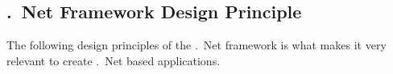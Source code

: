 %
%
%
%
%
%
%
%
%
%

\subsection*{.\ Net Framework Design Principle}
The following design principles of the .\ Net framework is what makes it very relevant to create .\ Net based applications.

%	
%	
%	
%	
%	

